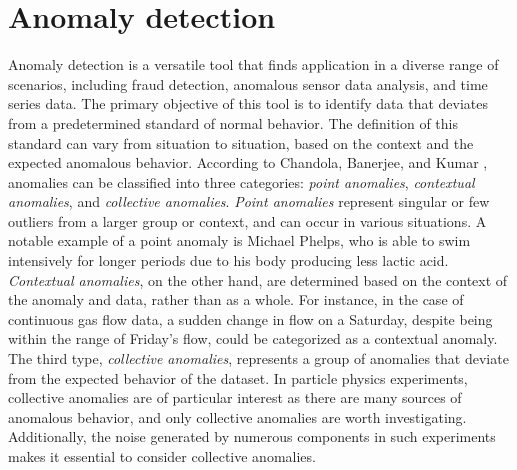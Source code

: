 \section{Anomaly detection}
Anomaly detection is a versatile tool that finds application in a diverse range of scenarios, 
including fraud detection, anomalous sensor data analysis, and time series data. The primary 
objective of this tool is to identify data that deviates from a predetermined standard of 
normal behavior. The definition of this standard can vary from situation to situation, based 
on the context and the expected anomalous behavior. According to Chandola, Banerjee, and 
Kumar \cite{anom_detec}, anomalies can be classified into three categories: \textit{point anomalies}, 
\textit{contextual anomalies}, and \textit{collective anomalies}. \textit{Point anomalies} represent singular or few 
outliers from a larger group or context, and can occur in various situations. A notable example 
of a point anomaly is Michael Phelps, who is able to swim intensively for longer periods due 
to his body producing less lactic acid. \textit{Contextual anomalies}, on the other hand, are determined 
based on the context of the anomaly and data, rather than as a whole. For instance, in the 
case of continuous gas flow data, a sudden change in flow on a Saturday, despite being within 
the range of Friday's flow, could be categorized as a contextual anomaly. The third type, 
\textit{collective anomalies}, represents a group of anomalies that deviate from the expected behavior 
of the dataset. In particle physics experiments, collective anomalies are of particular 
interest as there are many sources of anomalous behavior, and only collective anomalies are 
worth investigating. Additionally, the noise generated by numerous components in such 
experiments makes it essential to consider collective anomalies.
